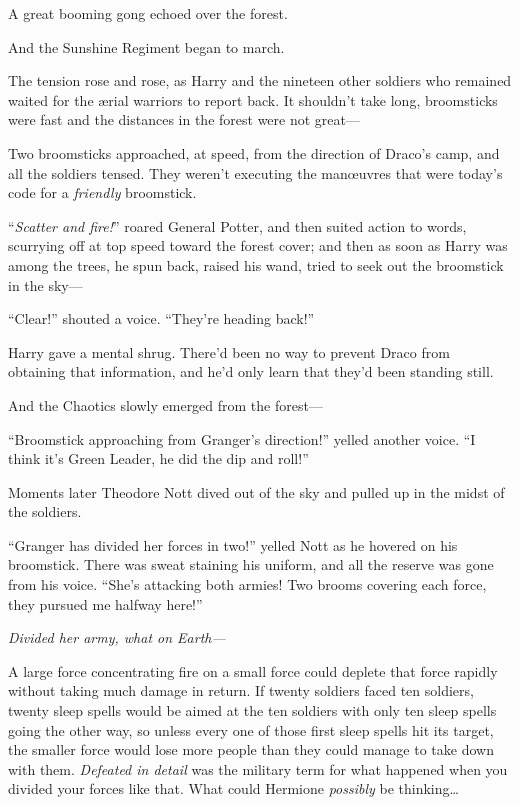 A great booming gong echoed over the forest.

And the Sunshine Regiment began to march.

\later

The tension rose and rose, as Harry and the nineteen other soldiers who remained waited for the ærial warriors to report back. It shouldn’t take long, broomsticks were fast and the distances in the forest were not great—

Two broomsticks approached, at speed, from the direction of Draco’s camp, and all the soldiers tensed. They weren’t executing the manœuvres that were today’s code for a \emph{friendly} broomstick.

“\emph{Scatter and fire!}” roared General Potter, and then suited action to words, scurrying off at top speed toward the forest cover; and then as soon as Harry was among the trees, he spun back, raised his wand, tried to seek out the broomstick in the sky—

“Clear!” shouted a voice. “They’re heading back!”

Harry gave a mental shrug. There’d been no way to prevent Draco from obtaining that information, and he’d only learn that they’d been standing still.

And the Chaotics slowly emerged from the forest—

“Broomstick approaching from Granger’s direction!” yelled another voice. “I think it’s Green Leader, he did the dip and roll!”

Moments later Theodore Nott dived out of the sky and pulled up in the midst of the soldiers.

“Granger has divided her forces in two!” yelled Nott as he hovered on his broomstick. There was sweat staining his uniform, and all the reserve was gone from his voice. “She’s attacking both armies! Two brooms covering each force, they pursued me halfway here!”

\emph{Divided her army, what on Earth—}

A large force concentrating fire on a small force could deplete that force rapidly without taking much damage in return. If twenty soldiers faced ten soldiers, twenty sleep spells would be aimed at the ten soldiers with only ten sleep spells going the other way, so unless every one of those first sleep spells hit its target, the smaller force would lose more people than they could manage to take down with them. \emph{Defeated in detail} was the military term for what happened when you divided your forces like that. What could Hermione \emph{possibly} be thinking…

